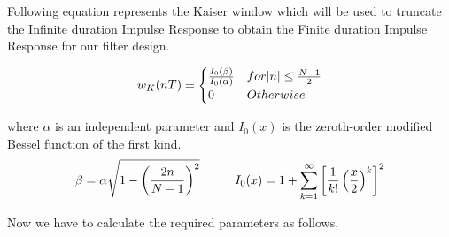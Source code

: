 \documentclass[a4paper,11pt]{article}%
\begin{document}
Following equation represents the Kaiser window which will be used to truncate the Infinite duration Impulse Response to obtain the Finite duration Impulse Response for our filter design.

\begin{equation}
w_K(nT) = \begin{cases}
	\frac{I_0(\beta)}{I_0(\alpha)} & for \abs{n}  \leq \frac{N-1}{2} \\
	0 & Otherwise
\end{cases}	
\end{equation}


where $\alpha$ is an independent parameter and $I_0(x)$ is the zeroth-order modified Bessel function of the first kind.\\
\[ 
\beta = \alpha\sqrt{1-\left(\frac{2n}{N-1}\right)^2} \hspace*{1cm} I_0(x) = 1+\sum_{k=1}^{\infty}\left[\frac{1}{k!}\left(\frac{x}{2}\right)^k\right]^2
 \]

Now we have to calculate the required parameters as follows,
\end{document}
